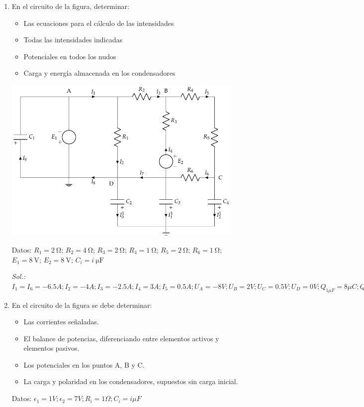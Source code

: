 \begin{enumerate}
\item En el circuito de la figura, determinar:
  \begin{itemize}
  \item Las ecuaciones para el cálculo de las intensidades
  \item Todas las intensidades indicadas
  \item Potenciales en todos los nudos
  \item Carga y energía almacenada en los condensadores
  \end{itemize}
  
  \begin{center}
    \includegraphics[height=8cm]{../figs/ej11_BT1.pdf}
  \end{center}


  Datos: $R_1 = \qty{2}{\ohm}$; $R_2 = \qty{4}{\ohm}$; $R_3 = \qty{2}{\ohm}$; $R_4 = \qty{1}{\ohm}$; $R_5 = \qty{2}{\ohm}$; $R_6 = \qty{1}{\ohm}$; $E_1 = \qty{8}{\volt}$; $E_2 = \qty{8}{\volt}$; $C_i = \qty[parse-numbers=false]{i}{\micro\farad}$

  \emph{Sol.:
    $I_1=I_6=-6.5A; I_2=-4A; I_3=-2.5A; I_4=3A; I_5=0.5A; U_A=-8V;
    U_B=2V; U_C=0.5V; U_D=0V;Q_{1\mu F}=8\mu C; Q_{2\mu F}=Q_{3\mu
      F}=0\mu C; Q_{4\mu F}=-2\mu C; E_{1\mu F}=32\mu F; E_{2\mu
      F}=E_{3\mu F}=0 J; E_{4\mu F}=0.5\mu C$}

\item En el circuito de la figura se debe determinar:
  \begin{itemize}
  \item Las corrientes señaladas.
  \item El balance de potencias, diferenciando entre elementos activos
    y elementos pasivos.
  \item Los potenciales en los puntos A, B y C.
  \item La carga y polaridad en los condensadores, supuestos sin carga
    inicial.
  \end{itemize}
  Datos:
  $\epsilon_1 ={1}V; \epsilon_2 ={7}V; R_i = {1}\Omega; C_i = {i}{\mu
    F}$


\end{enumerate}
